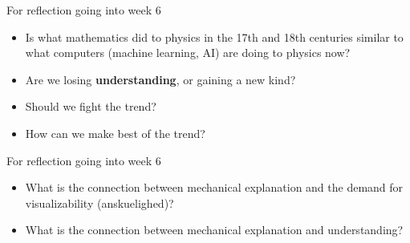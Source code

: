 \documentclass[fleqn]{beamer}
\newcommand{\kw}[1]{\textbf{#1}}
\begin{document}
\begin{frame}{For reflection going into week 6}

  \begin{itemize}
  \item Is what mathematics did to physics in the 17th and 18th
    centuries similar to what computers (machine learning, AI) are
    doing to physics now?
  \item Are we losing \kw{understanding}, or gaining a new kind?
  \item Should we fight the trend?
  \item How can we make best of the trend?
  \end{itemize}
\end{frame}


\begin{frame}{For reflection going into week 6} 

  \begin{itemize}
  \item What is the connection between mechanical explanation and the
    demand for visualizability (anskuelighed)?
  \item What is the connection between mechanical explanation and
    understanding?
  \end{itemize}
  
\end{frame}
\end{document}
